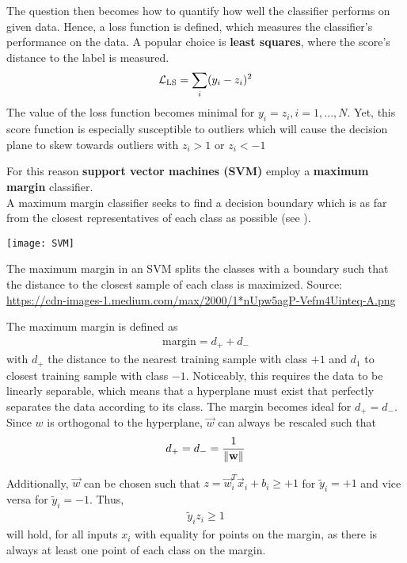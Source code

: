 The question then becomes how to quantify how well the classifier performs on given data.
Hence, a loss function is defined, which measures the classifier's performance on the data.
A popular choice is \textbf{least squares}, where the score's distance to the label is measured.
\begin{align}
    \mathcal{L}_{\text{LS}} = \sum_i (y_i - z_i)^2
\end{align}
The value of the loss function becomes minimal for $y_i = z_i, i = 1,...,N$.
Yet, this score function is especially susceptible to outliers which will cause the decision plane to skew towards outliers with $z_i > 1$ or $z_i < -1$

For this reason \textbf{support vector machines (SVM)} employ a \textbf{maximum margin} classifier.\\
A maximum margin classifier seeks to find a decision boundary which is as far from the closest representatives of each class as possible (see ).
\begin{marginfigure}
    \texttt{[image: SVM]}
    \caption[]{The maximum margin in an SVM splits the classes with a boundary such that the distance to the closest sample of each class is maximized. Source: \url{https://cdn-images-1.medium.com/max/2000/1*nUpw5agP-Vefm4Uinteq-A.png}}
\end{marginfigure}

The maximum margin is defined as
\begin{align}
    \text{margin} = d_+ + d_-
\end{align}
with $d_+$ the distance to the nearest training sample with class $+1$ and $d_1$ to closest training sample with class $-1$.
Noticeably, this requires the data to be linearly separable, which means that a hyperplane must exist that perfectly separates the data according to its class.
The margin becomes ideal for $d_+ = d_-$.
Since $w$ is orthogonal to the hyperplane, $\vec{w}$ can always be rescaled such that 
\begin{align}
    d_+ = d_- = \frac{1}{\left\lVert\mathbf{w}\right\rVert}
\end{align}

Additionally, $\vec{w}$ can be chosen such that $z = \vec{w}_i^T \vec{x}_i + b_i \geq +1$ for $\tilde{y}_i = +1$ and vice versa for $\tilde{y}_i = -1$.
Thus,
\begin{align}
    \tilde{y}_i z_i \geq 1
\end{align}
will hold, for all inputs $x_i$ with equality for points on the margin, as there is always at least one point of each class on the margin.

